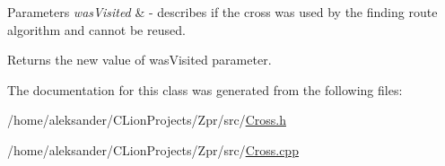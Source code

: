 \begin{DoxyParams}{Parameters}
{\em was\-Visited} & -\/ describes if the cross was used by the finding route algorithm and cannot be reused. \\
\hline
\end{DoxyParams}
\begin{DoxyReturn}{Returns}
the new value of was\-Visited parameter. 
\end{DoxyReturn}


The documentation for this class was generated from the following files\-:\begin{DoxyCompactItemize}
\item 
/home/aleksander/\-C\-Lion\-Projects/\-Zpr/src/\hyperlink{Cross_8h}{Cross.\-h}\item 
/home/aleksander/\-C\-Lion\-Projects/\-Zpr/src/\hyperlink{Cross_8cpp}{Cross.\-cpp}\end{DoxyCompactItemize}
